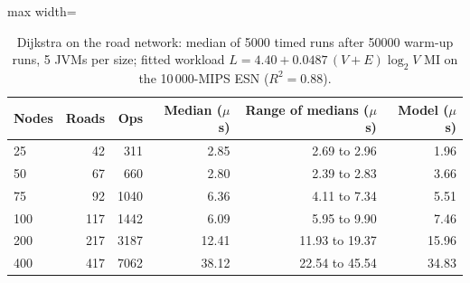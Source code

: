 \begin{table}[htbp]
\centering
\caption{Dijkstra on the road network: median of 5000 timed runs after 50000 warm-up runs, 5 JVMs per size; fitted workload $L = 4.40 + 0.0487\,(V+E)\log_2 V$ MI on the 10\,000-MIPS ESN ($R^2 = 0.88$).}
\label{tab:calibration}
\begin{adjustbox}{max width=\textwidth}
\begin{tabular}{lrrrrr}
\toprule
Nodes & Roads & Ops & Median ($\mu$s) & Range of medians ($\mu$s) & Model ($\mu$s) \\
\midrule
25 & 42 & 311 & 2.85 & 2.69 to 2.96 & 1.96 \\
50 & 67 & 660 & 2.80 & 2.39 to 2.83 & 3.66 \\
75 & 92 & 1040 & 6.36 & 4.11 to 7.34 & 5.51 \\
100 & 117 & 1442 & 6.09 & 5.95 to 9.90 & 7.46 \\
200 & 217 & 3187 & 12.41 & 11.93 to 19.37 & 15.96 \\
400 & 417 & 7062 & 38.12 & 22.54 to 45.54 & 34.83 \\
\bottomrule
\end{tabular}
\end{adjustbox}
\end{table}
